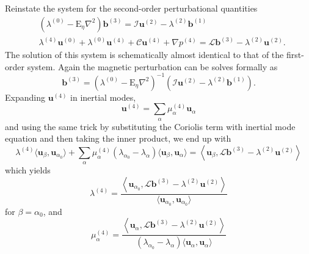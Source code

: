 Reinstate the system for the second-order perturbational quantities
%
\begin{equation}
    \begin{aligned}
        & \left(\lambda^{(0)} - \mathrm{E}_\eta \nabla^2\right) \mathbf{b}^{(3)} = \mathcal{I} \mathbf{u}^{(2)} - \lambda^{(2)} \mathbf{b}^{(1)} \\
        &\lambda^{(4)} \mathbf{u}^{(0)} + \lambda^{(0)} \mathbf{u}^{(4)} + \mathcal{C} \mathbf{u}^{(4)} + \nabla p^{(4)} = \mathcal{L} \mathbf{b}^{(3)} - \lambda^{(2)} \mathbf{u}^{(2)}.
    \end{aligned}
\end{equation}
%
The solution of this system is schematically almost identical to that of the first-order system. Again the magnetic perturbation can be solves formally as 
%
\begin{equation}
    \mathbf{b}^{(3)} = \left(\lambda^{(0)} - \mathrm{E}_\eta \nabla^2\right)^{-1} \left(\mathcal{I} \mathbf{u}^{(2)} - \lambda^{(2)} \mathbf{b}^{(1)}\right).
\end{equation}
%
Expanding $\mathbf{u}^{(4)}$ in inertial modes,
%
\begin{equation}
    \mathbf{u}^{(4)} = \sum_\alpha \mu_{\alpha}^{(4)} \mathbf{u}_\alpha
\end{equation}
%
and using the same trick by substituting the Coriolis term with inertial mode equation and then taking the inner product, we end up with 
%
\begin{equation}
    \lambda^{(4)} \langle \mathbf{u}_\beta, \mathbf{u}_{\alpha_0} \rangle + \sum_\alpha \mu_{\alpha}^{(4)} \left(\lambda_{\alpha_0} - \lambda_\alpha\right) \langle \mathbf{u}_\beta, \mathbf{u}_\alpha \rangle = \left\langle \mathbf{u}_\beta, \mathcal{L} \mathbf{b}^{(3)} - \lambda^{(2)} \mathbf{u}^{(2)} \right\rangle
\end{equation}
%
which yields 
%
\begin{equation}
    \lambda^{(4)} = \frac{\left\langle \mathbf{u}_{\alpha_0}, \mathcal{L} \mathbf{b}^{(3)} - \lambda^{(2)} \mathbf{u}^{(2)} \right\rangle}{\langle \mathbf{u}_{\alpha_0}, \mathbf{u}_{\alpha_0} \rangle}
\end{equation}
%
for $\beta = \alpha_0$, and
%
\begin{equation}
    \mu_{\alpha}^{(4)} = \frac{\left\langle \mathbf{u}_{\alpha}, \mathcal{L} \mathbf{b}^{(3)} - \lambda^{(2)} \mathbf{u}^{(2)} \right\rangle}{(\lambda_{\alpha_0} - \lambda_\alpha) \langle \mathbf{u}_{\alpha}, \mathbf{u}_{\alpha} \rangle}
\end{equation}
